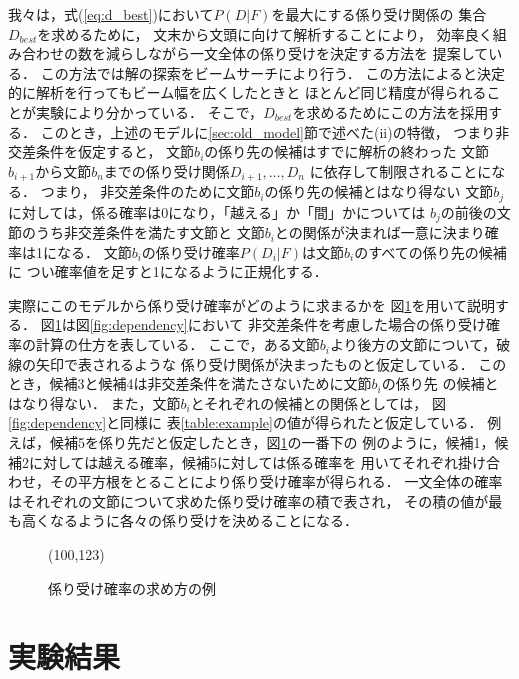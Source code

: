 我々は，式(\ref{eq:d_best})において$P(D|F)$を最大にする係り受け関係の
集合$D_{best}$を求めるために，
文末から文頭に向けて解析することにより，
効率良く組み合わせの数を減らしながら一文全体の係り受けを決定する方法を
提案している\cite{Sekine:99}．
この方法では解の探索をビームサーチにより行う．
この方法によると決定的に解析を行ってもビーム幅を広くしたときと
ほとんど同じ精度が得られることが実験により分かっている．
そこで，$D_{best}$を求めるためにこの方法を採用する．
このとき，上述のモデルに\ref{sec:old_model}節で述べた(ii)の特徴，
つまり非交差条件を仮定すると，
文節$b_{i}$の係り先の候補はすでに解析の終わった
文節$b_{i+1}$から文節$b_{n}$までの係り受け関係$D_{i+1},\ldots,D_{n}$
に依存して制限されることになる．
つまり，
非交差条件のために文節$b_{i}$の係り先の候補とはなり得ない
文節$b_{j}$に対しては，係る確率は0になり，「越える」か「間」かについては
$b_{j}$の前後の文節のうち非交差条件を満たす文節と
文節$b_{i}$との関係が決まれば一意に決まり確率は1になる．
文節$b_{i}$の係り受け確率$P(D_{i}|F)$は文節$b_{i}$のすべての係り先の候補に
つい確率値を足すと1になるように正規化する．

実際にこのモデルから係り受け確率がどのように求まるかを
図\ref{fig:dependency2}を用いて説明する．
図\ref{fig:dependency2}は図\ref{fig:dependency}において
非交差条件を考慮した場合の係り受け確率の計算の仕方を表している．
ここで，ある文節$b_{i}$より後方の文節について，破線の矢印で表されるような
係り受け関係が決まったものと仮定している．
このとき，候補3と候補4は非交差条件を満たさないために文節$b_{i}$の係り先
の候補とはなり得ない．
また，文節$b_{i}$とそれぞれの候補との関係としては，
図\ref{fig:dependency}と同様に
表\ref{table:example}の値が得られたと仮定している．
例えば，候補5を係り先だと仮定したとき，図\ref{fig:dependency2}の一番下の
例のように，候補1，候補2に対しては越える確率，候補5に対しては係る確率を
用いてそれぞれ掛け合わせ，その平方根をとることにより係り受け確率が得られる．
一文全体の確率はそれぞれの文節について求めた係り受け確率の積で表され，
その積の値が最も高くなるように各々の係り受けを決めることになる．
\begin{figure}[htbp]
  \begin{center}
    \leavevmode
\atari(100,123)
    \caption{係り受け確率の求め方の例}
    \label{fig:dependency2}
  \end{center}
\end{figure}

\section{実験結果}
\label{sec:results}

